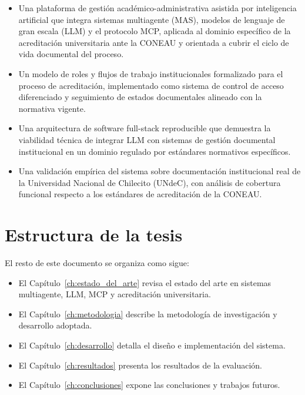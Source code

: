 \begin{itemize}
    \item Una plataforma de gesti\'{o}n acad\'{e}mico-administrativa asistida por inteligencia artificial que integra sistemas multiagente (MAS), modelos de lenguaje de gran escala (LLM) y el protocolo MCP, aplicada al dominio espec\'{i}fico de la acreditaci\'{o}n universitaria ante la CONEAU y orientada a cubrir el ciclo de vida documental del proceso.
    \item Un modelo de roles y flujos de trabajo institucionales formalizado para el proceso de acreditaci\'{o}n, implementado como sistema de control de acceso diferenciado y seguimiento de estados documentales alineado con la normativa vigente.
    \item Una arquitectura de software full-stack reproducible que demuestra la viabilidad t\'{e}cnica de integrar LLM con sistemas de gesti\'{o}n documental institucional en un dominio regulado por est\'{a}ndares normativos espec\'{i}ficos.
    \item Una validaci\'{o}n emp\'{i}rica del sistema sobre documentaci\'{o}n institucional real de la Universidad Nacional de Chilecito (UNdeC), con an\'{a}lisis de cobertura funcional respecto a los est\'{a}ndares de acreditaci\'{o}n de la CONEAU.
\end{itemize}

\section{Estructura de la tesis}
\label{sec:estructura}

El resto de este documento se organiza como sigue:

\begin{itemize}
    \item El Capítulo~\ref{ch:estado_del_arte} revisa el estado del arte en sistemas multiagente, LLM, MCP y acreditación universitaria.
    \item El Capítulo~\ref{ch:metodologia} describe la metodología de investigación y desarrollo adoptada.
    \item El Capítulo~\ref{ch:desarrollo} detalla el diseño e implementación del sistema.
    \item El Capítulo~\ref{ch:resultados} presenta los resultados de la evaluación.
    \item El Capítulo~\ref{ch:conclusiones} expone las conclusiones y trabajos futuros.
\end{itemize}
